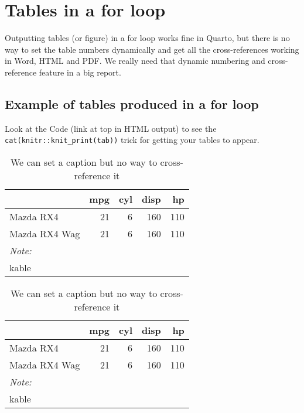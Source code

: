\documentclass[
  letterpaper,
  oneside]{scrbook}
\begin{document}

\hypertarget{tables-in-a-for-loop}{%
\chapter{Tables in a for loop}\label{tables-in-a-for-loop}}

Outputting tables (or figure) in a for loop works fine in Quarto, but
there is no way to set the table numbers dynamically and get all the
cross-references working in Word, HTML and PDF. We really need that
dynamic numbering and cross-reference feature in a big report.

\hypertarget{example-of-tables-produced-in-a-for-loop}{%
\section{Example of tables produced in a for
loop}\label{example-of-tables-produced-in-a-for-loop}}

Look at the Code (link at top in HTML output) to see the
\texttt{cat(knitr::knit\_print(tab))} trick for getting your tables to
appear.

\begin{table}

\caption{We can set a caption but no way to cross-reference it}
\centering
\begin{tabular}[t]{lrrrr}
\toprule
  & mpg & cyl & disp & hp\\
\midrule
Mazda RX4 & 21 & 6 & 160 & 110\\
Mazda RX4 Wag & 21 & 6 & 160 & 110\\
\bottomrule
\multicolumn{5}{l}{\rule{0pt}{1em}\textit{Note: }}\\
\multicolumn{5}{l}{\rule{0pt}{1em}kable}\\
\end{tabular}
\end{table}

\begin{table}

\caption{We can set a caption but no way to cross-reference it}
\centering
\begin{tabular}[t]{lrrrr}
\toprule
  & mpg & cyl & disp & hp\\
\midrule
Mazda RX4 & 21 & 6 & 160 & 110\\
Mazda RX4 Wag & 21 & 6 & 160 & 110\\
\bottomrule
\multicolumn{5}{l}{\rule{0pt}{1em}\textit{Note: }}\\
\multicolumn{5}{l}{\rule{0pt}{1em}kable}\\
\end{tabular}
\end{table}
\end{document}
